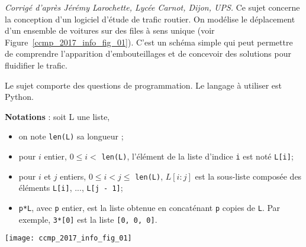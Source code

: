 



\ifprof
\textit{Corrigé d'après Jérémy Larochette, Lycée Carnot, Dijon, UPS.}
\else
\fi
Ce sujet concerne la conception d'un logiciel d'étude de trafic routier. On modélise le déplacement d'un ensemble de voitures sur des files à sens unique (voir Figure~\ref{ccmp_2017_info_fig_01}). C'est un schéma simple qui peut permettre de comprendre l'apparition d'embouteillages et de concevoir des solutions pour fluidifier le trafic.

Le sujet comporte des questions de programmation. Le langage à utiliser est Python.

\textbf{Notations} :
soit L une liste,
\begin{itemize}
    \item[\textbullet] on note \lstinline{len(L)} sa longueur ;
    \item[\textbullet]  pour $i$ entier, $0 \leqslant  i <$ \lstinline{len(L)}, l'élément de la liste d'indice \lstinline{i} est noté \lstinline{L[i]};
    \item[\textbullet]   pour $i$ et $j$ entiers, $0 \leqslant i < j \leqslant $ \lstinline{len(L)}, $L[i : j]$ est la sous-liste composée des éléments \lstinline{L[i]},
..., \lstinline{L[j - 1]};
    \item[\textbullet]  \lstinline{p*L}, avec \lstinline{p} entier, est la liste obtenue en concaténant \lstinline{p} copies de \lstinline{L}. Par exemple, \lstinline{3*[0]} est
la liste \lstinline{[0, 0, 0]}.
\end{itemize}



\begin{center}


\texttt{[image: ccmp\_2017\_info\_fig\_01]}
	
\end{center}

